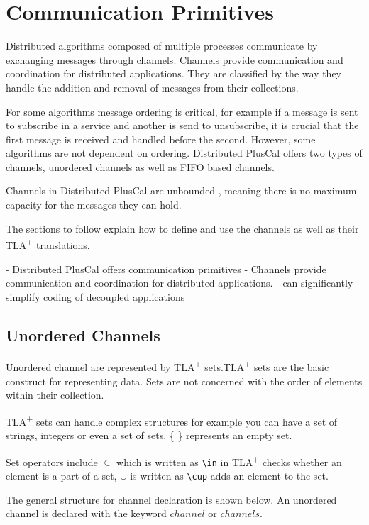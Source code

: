 \documentclass{thesul}
\newcommand{\tlaplus}{TLA\textsuperscript{+}\xspace}
\begin{document}
\FloatBarrier
\section{Communication Primitives}
\label{comChannels}

Distributed algorithms composed of multiple processes communicate by exchanging messages through channels. Channels provide communication and coordination for distributed applications. They are classified by the way they handle the addition and removal of messages from their collections. 

For some algorithms message ordering is critical, for example if a message is sent to subscribe in a service and another is send to unsubscribe, it is crucial that the first message is received and handled before the second. However, some algorithms are not dependent on ordering. Distributed PlusCal offers two types of channels, unordered channels as well as FIFO based channels.

Channels in Distributed PlusCal are unbounded , meaning there is no maximum capacity for the messages they can hold.

The sections to follow explain how to define and use the channels as well as their \tlaplus translations. 


- Distributed PlusCal offers communication primitives 
- Channels provide communication and coordination for distributed applications.
- can significantly simplify coding of decoupled applications

\subsection{Unordered Channels}

Unordered channel are represented by \tlaplus sets.\tlaplus sets are the basic construct for representing data. Sets are not concerned with the order of elements within their collection.

\tlaplus sets can handle complex structures for example you can have a set of strings, integers or even a set of sets. \{ \} represents an empty set. 

Set operators include $\in$ which is written as \lstinline|\in| in \tlaplus checks whether an element is a part of a set, $\cup$ is written as \lstinline|\cup| adds an element to the set.

The general structure for channel declaration is shown below. An unordered channel is declared with the keyword $channel$ or $channels$. 
\end{document}
